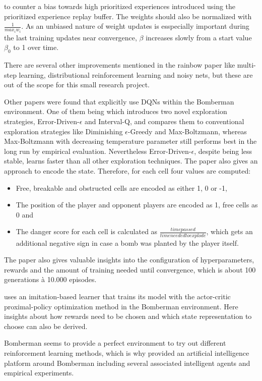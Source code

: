 to counter a bias towards high prioritized experiences introduced using the prioritized experience replay buffer. The weights should also be normalized with $\frac{1}{max_i w_i}$. As an unbiased nature of weight updates is esspecially important during the last training updates near convergence, $\beta$ increases slowly from a start value $\beta_0$ to 1 over time. 

There are several other improvements mentioned in the rainbow paper \cite{Hessel2017} like multi-step learning, distributional reinforcement learning and noisy nets, but these are out of the scope for this small research project. 

Other papers were found that explicitly use DQNs within the Bomberman environment. One of them being \cite{Kormelink2018} which introduces two novel exploration strategies, Error-Driven-$\epsilon$ and Interval-Q, and compares them to conventional exploration strategies like Diminishing $\epsilon$-Greedy and Max-Boltzmann, whereas Max-Boltzmann with decreasing temperature parameter still performs best in the long run by empirical evaluation. Nevertheless Error-Driven-$\epsilon$, despite being less stable, learns faster than all other exploration techniques. The paper also gives an approach to encode the state. Therefore, for each cell four values are computed:

\begin{itemize}
	\item Free, breakable and obstructed cells are encoded as either 1, 0 or -1,
	\item The position of the player and opponent players are encoded as 1, free cells as 0 and
	\item The danger score for each cell is calculated as $\frac{time passed}{time needed to explode}$, which gets an additional negative sign in case a bomb was planted by the player itself.
\end{itemize}

The paper also gives valuable insights into the configuration of hyperparameters, rewards and the amount of training needed until convergence, which is about 100 generations à 10.000 episodes. 

\cite{Franca2019} uses an imitation-based learner that trains its model with the actor-critic proximal-policy optimization method in the Bomberman environment. Here insights about how rewards need to be chosen and which state representation to choose can also be derived. 

Bomberman seems to provide a perfect environment to try out different reinforcement learning methods, which is why \cite{daCruzLopes2016} provided an artificial intelligence platform around Bomberman including several associated intelligent agents and empirical experiments. 

